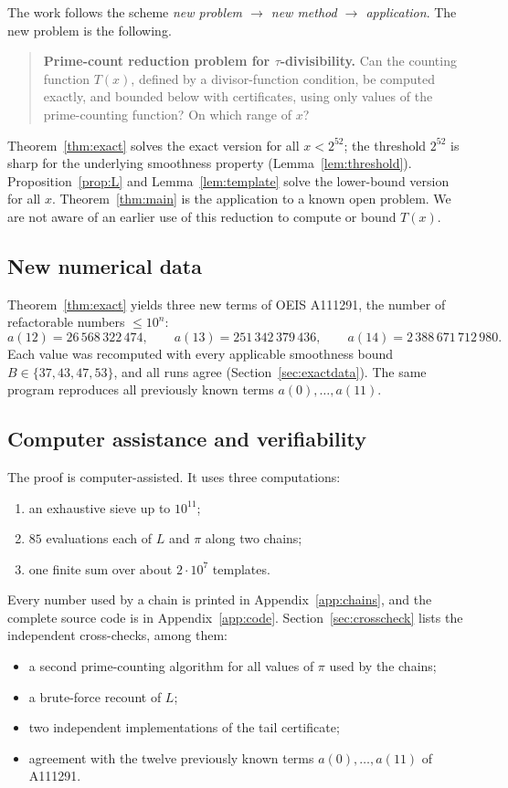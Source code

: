 \documentclass[11pt,a4paper]{article}
\theoremstyle{definition}
\begin{document}
The work follows the scheme \emph{new problem $\to$ new method $\to$ application}. The new problem is the following.
\begin{quote}
\textbf{Prime-count reduction problem for $\tau$-divisibility.} Can the counting function $T(x)$, defined by a divisor-function condition, be computed exactly, and bounded below with certificates, using only values of the prime-counting function? On which range of $x$?
\end{quote}
Theorem~\ref{thm:exact} solves the exact version for all $x<2^{52}$; the threshold $2^{52}$ is sharp for the underlying smoothness property (Lemma~\ref{lem:threshold}). Proposition~\ref{prop:L} and Lemma~\ref{lem:template} solve the lower-bound version for all $x$. Theorem~\ref{thm:main} is the application to a known open problem. We are not aware of an earlier use of this reduction to compute or bound $T(x)$.

\subsection{New numerical data}

Theorem~\ref{thm:exact} yields three new terms of OEIS A111291, the number of refactorable numbers $\le10^n$:
\[
a(12)=26\,568\,322\,474,\qquad a(13)=251\,342\,379\,436,\qquad a(14)=2\,388\,671\,712\,980 .
\]
Each value was recomputed with every applicable smoothness bound $B\in\{37,43,47,53\}$, and all runs agree (Section~\ref{sec:exactdata}). The same program reproduces all previously known terms $a(0),\dots,a(11)$.

\subsection{Computer assistance and verifiability}

The proof is computer-assisted. It uses three computations:
\begin{enumerate}
\item[(a)] an exhaustive sieve up to $10^{11}$;
\item[(b)] $85$ evaluations each of $L$ and $\pi$ along two chains;
\item[(c)] one finite sum over about $2\cdot10^7$ templates.
\end{enumerate}
Every number used by a chain is printed in Appendix~\ref{app:chains}, and the complete source code is in Appendix~\ref{app:code}. Section~\ref{sec:crosscheck} lists the independent cross-checks, among them:
\begin{itemize}
\item a second prime-counting algorithm for all values of $\pi$ used by the chains;
\item a brute-force recount of $L$;
\item two independent implementations of the tail certificate;
\item agreement with the twelve previously known terms $a(0),\dots,a(11)$ of A111291.
\end{itemize}
\end{document}
